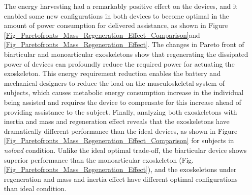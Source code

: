 \documentclass[10pt,letterpaper]{article}
\begin{document}
The energy harvesting had a remarkably positive effect on the devices, and it enabled some new configurations in both devices to become optimal in the amount of power consumption for delivered assistance, as shown in Figure \ref{Fig_Paretofronts_Mass_Regeneration_Effect_Comparison}and \ref{Fig_Paretofronts_Mass_Regeneration_Effect}. The changes in Pareto front of biarticular and monoarticular exoskeletons show that regenerating the dissipated power of devices can profoundly reduce the required power for actuating the exoskeleton. This energy requirement reduction enables the battery and mechanical designers to reduce the load on the musculoskeletal system of subjects, which causes metabolic energy consumption increase in the individual being assisted and requires the device to compensate for this increase ahead of providing assistance to the subject. Finally, analyzing both exoskeletons with inertia and mass and regeneration effect reveals that the exoskeletons have dramatically different performance than the ideal devices, as shown in Figure \ref{Fig_Paretofronts_Mass_Regeneration_Effect_Comparison}  for subjects in {\it noload} condition. Unlike the ideal optimal trade-off, the biarticular device shows superior performance than the monoarticular exoskeleton (Fig. \ref{Fig_Paretofronts_Mass_Regeneration_Effect}), and the exoskeletons under regeneration and mass and inertia effect have different optimal configurations than ideal condition.\\
\end{document}
